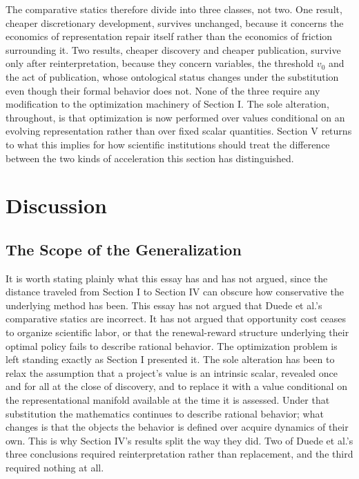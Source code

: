\documentclass[11pt]{article}
\begin{document}
\bigskip
\noindent The comparative statics therefore divide into three classes, not two. One result, cheaper discretionary development, survives unchanged, because it concerns the economics of representation repair itself rather than the economics of friction surrounding it. Two results, cheaper discovery and cheaper publication, survive only after reinterpretation, because they concern variables, the threshold $v_0$ and the act of publication, whose ontological status changes under the substitution even though their formal behavior does not. None of the three require any modification to the optimization machinery of Section I. The sole alteration, throughout, is that optimization is now performed over values conditional on an evolving representation rather than over fixed scalar quantities. Section V returns to what this implies for how scientific institutions should treat the difference between the two kinds of acceleration this section has distinguished.

\section{Discussion}

\subsection{The Scope of the Generalization}

It is worth stating plainly what this essay has and has not argued, since the distance traveled from Section I to Section IV can obscure how conservative the underlying method has been. This essay has not argued that Duede et al.'s comparative statics are incorrect. It has not argued that opportunity cost ceases to organize scientific labor, or that the renewal-reward structure underlying their optimal policy fails to describe rational behavior. The optimization problem is left standing exactly as Section I presented it. The sole alteration has been to relax the assumption that a project's value is an intrinsic scalar, revealed once and for all at the close of discovery, and to replace it with a value conditional on the representational manifold available at the time it is assessed. Under that substitution the mathematics continues to describe rational behavior; what changes is that the objects the behavior is defined over acquire dynamics of their own. This is why Section IV's results split the way they did. Two of Duede et al.'s three conclusions required reinterpretation rather than replacement, and the third required nothing at all.
\end{document}
